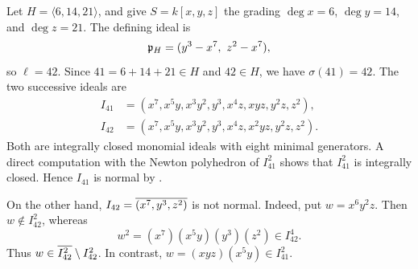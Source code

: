 \begin{example}\label{ex:successive-cutoffs-eight-generators}
Let $H=\langle6,14,21\rangle$, and give $S=k[x,y,z]$ the grading
$\deg x=6$, $\deg y=14$, and $\deg z=21$.  The defining ideal is
\[
 \fkp_H=(y^3-x^7,\ z^2-x^7),
\]
so $\ell=42$.  Since $41=6+14+21\in H$ and $42\in H$, we have
$\sigma(41)=42$.  The two successive ideals are
\[
\begin{aligned}
 I_{41}&=(x^7,x^5y,x^3y^2,y^3,x^4z,xyz,y^2z,z^2),\\
 I_{42}&=(x^7,x^5y,x^3y^2,y^3,x^4z,x^2yz,y^2z,z^2).
\end{aligned}
\]
Both are integrally closed monomial ideals with eight minimal generators.
A direct computation with the Newton polyhedron of $I_{41}^2$ shows
that $I_{41}^2$ is integrally closed.  Hence $I_{41}$ is normal by
\cite[Proposition~3.1]{ReidRobertsVitulli2003}.

On the other hand, $I_{42}=\overline{(x^7,y^3,z^2)}$ is not normal.
Indeed, put $w=x^6y^2z$.  Then $w\notin I_{42}^2$, whereas
\[
 w^2=(x^7)(x^5y)(y^3)(z^2)\in I_{42}^4.
\]
Thus $w\in\overline{I_{42}^2}\setminus I_{42}^2$.  In contrast,
$w=(xyz)(x^5y)\in I_{41}^2$.
\end{example}
